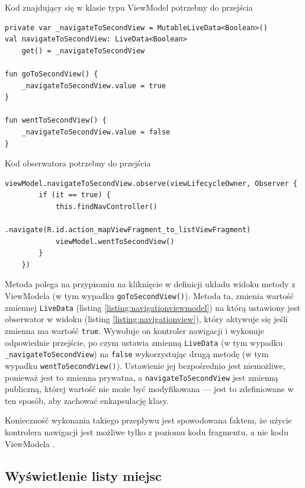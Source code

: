 \documentclass[polish,polish,a4paper,12pt]{article}
\begin{document}
	\begin{listing}[H]
		\caption{Kod znajdujący się w klasie typu ViewModel potrzebny do przejścia}
		\begin{verbatim}
private var _navigateToSecondView = MutableLiveData<Boolean>()
val navigateToSecondView: LiveData<Boolean>
	get() = _navigateToSecondView

fun goToSecondView() {
	_navigateToSecondView.value = true
}

fun wentToSecondView() {
	_navigateToSecondView.value = false
}
		\end{verbatim}
		\label{listing:navigationviewmodel}
	\end{listing}

	\begin{listing}[H]
		\caption{Kod obserwatora potrzebny do przejścia}
		\begin{verbatim}
viewModel.navigateToSecondView.observe(viewLifecycleOwner, Observer {
		if (it == true) {
			this.findNavController()
				.navigate(R.id.action_mapViewFragment_to_listViewFragment)
			viewModel.wentToSecondView()
		}
	})
		\end{verbatim}
		\label{listing:navigationview}
	\end{listing}

	Metoda polega na przypisaniu na kliknięcie w definicji układu widoku metody z ViewModela (w tym wypadku \texttt{goToSecondView()}). Metoda ta, zmienia wartość zmiennej \texttt{LiveData} (listing \ref{listing:navigationviewmodel}) na którą ustawiony jest obserwator w widoku (listing \ref{listing:navigationview}), który aktywuje się jeśli zmienna ma wartość \texttt{true}. Wywołuje on kontroler nawigacji i wykonuje odpowiednie przejście, po czym ustawia zmienną \texttt{LiveData} (w tym wypadku \texttt{\_navigateToSecondView}) na \texttt{false} wykorzystując drugą metodę (w tym wypadku \texttt{wentToSecondView()}). Ustawienie jej bezpośrednio jest niemożliwe, ponieważ jest to zmienna prywatna, a \texttt{navigateToSecondView} jest zmienną publiczną, której wartość nie może być modyfikowana — jest to zdefiniowane w ten sposób, aby zachować enkapsulację klasy.

	Konieczność wykonania takiego przepływu jest spowodowana faktem, że użycie kontrolera nawigacji jest możliwe tylko z poziomu kodu fragmentu, a nie kodu ViewModela \cite{androidapi}.

	\subsection{Wyświetlenie listy miejsc}
\end{document}
